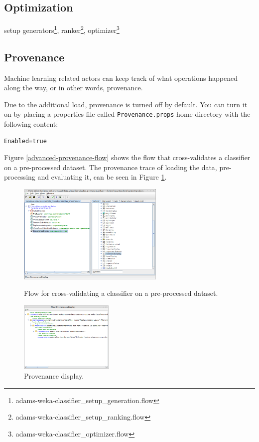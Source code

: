 \subsection{Optimization}
setup generators\footnote{adams-weka-classifier\_setup\_generation.flow},
ranker\footnote{adams-weka-classifier\_setup\_ranking.flow},
optimizer\footnote{adams-weka-classifier\_optimizer.flow}

\subsection{Provenance}
Machine learning related actors can keep track of what operations happened
along the way, or in other words, provenance.

Due to the additional load, provenance is turned off by default. You can turn
it on by placing a properties file called \texttt{Provenance.props}
home directory with the following content:
\begin{verbatim}
Enabled=true
\end{verbatim}

Figure \ref{advanced-provenance-flow} shows the flow that cross-validates a
classifier on a pre-processed dataset. The provenance trace of loading
the data, pre-processing and evaluating it, can be seen in Figure 
\ref{advanced-provenance-output}.

\begin{figure}[ht]
  \begin{minipage}[t]{0.55\linewidth}
    \centering
    \includegraphics[width=7.0cm]{images/advanced-provenance-flow.png}
    \caption{Flow for cross-validating a classifier on a pre-processed dataset.}
    \label{advanced-provenance-flow}
  \end{minipage}
  \hspace{0.5cm}
  \begin{minipage}[t]{0.45\linewidth}
    \centering
    \includegraphics[width=4.5cm]{images/advanced-provenance-output.png}
    \caption{Provenance display.}
    \label{advanced-provenance-output}
  \end{minipage}
\end{figure}

